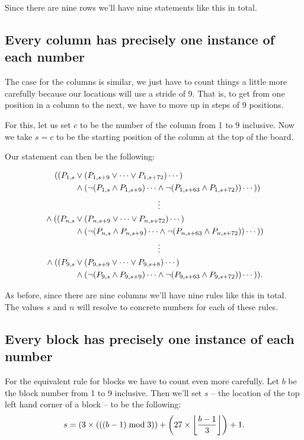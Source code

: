 \documentclass[10pt]{article}
\begin{document}
Since there are nine rows we'll have nine statements like this in total.

\subsection{Every column has precisely one instance of each number}

The case for the columns is similar, we just have to count things a little more carefully because our locations will use a stride of 9. That is, to get from one position in a column to the next, we have to move up in steps of 9 positions.

For this, let us set $c$ to be the number of the column from 1 to 9 inclusive. Now we take $s = c$ to be the starting position of the column at the top of the board.

Our statement can then be the following:

\begin{align*}
((P_{1, s} & \lor (P_{1, s + 9} \lor \cdots \lor P_{1, s + 72}) \cdots ) \\
& \land (\lnot(P_{1, s} \land P_{1, s + 9}) \cdots \land \lnot(P_{1, s + 63} \land P_{1, s + 72})) \cdots )) \\
& \qquad \qquad \qquad \qquad \qquad \vdots \\
{} \land ((P_{n, s} & \lor (P_{n, s + 9} \lor \cdots \lor P_{n, s + 72}) \cdots ) \\
& \land (\lnot(P_{n, s} \land P_{n, s + 9}) \cdots \land \lnot(P_{n, s + 63} \land P_{n, s + 72})) \cdots )) \\
& \qquad \qquad \qquad \qquad \qquad \vdots \\
{} \land ((P_{9, s} & \lor (P_{9,s + 9} \lor \cdots \lor P_{9, s + 8}) \cdots ) \\
& \land (\lnot(P_{9, s} \land P_{9, s + 9}) \cdots \land \lnot(P_{9, s + 63} \land P_{9, s + 72})) \cdots )) .
\end{align*}



As before, since there are nine columns we'll have nine rules like this in total. The values $s$ and $n$ will resolve to concrete numbers for each of these rules.

\subsection{Every block has precisely one instance of each number}

For the equivalent rule for blocks we have to count even more carefully. Let $b$ be the block number from 1 to 9 inclusive. Then we'll set $s$ -- the location of the top left hand corner of a block -- to be the following:
$$
s = (3 \times (((b - 1) \bmod 3)) + \left(27 \times \left\lfloor \frac{b - 1}{3} \right\rfloor\right) + 1 .
$$
\end{document}
